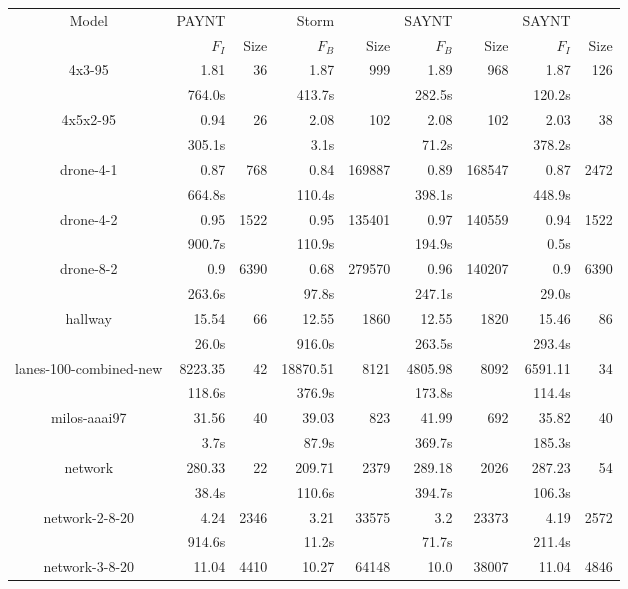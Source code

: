 \documentclass{article}
\begin{document}
\begin{table}
\begin{tabular}{|c|rr|rr|rr|rr|}
\hline

Model & PAYNT & & Storm & & SAYNT & & SAYNT & \\ 

 & $F_{I}$ & Size & $F_{B}$ & Size & $F_{B}$ & Size & $F_{I}$ & Size \\ \hline 

4x3-95 & 1.81 & 36 & 1.87 & 999 & 1.89 & 968 & 1.87 & 126 \\
 & 764.0s & & 413.7s & & 282.5s & & 120.2s & \\
\hline
4x5x2-95 & 0.94 & 26 & 2.08 & 102 & 2.08 & 102 & 2.03 & 38 \\
 & 305.1s & & 3.1s & & 71.2s & & 378.2s & \\
\hline
drone-4-1 & 0.87 & 768 & 0.84 & 169887 & 0.89 & 168547 & 0.87 & 2472 \\
 & 664.8s & & 110.4s & & 398.1s & & 448.9s & \\
\hline
drone-4-2 & 0.95 & 1522 & 0.95 & 135401 & 0.97 & 140559 & 0.94 & 1522 \\
 & 900.7s & & 110.9s & & 194.9s & & 0.5s & \\
\hline
drone-8-2 & 0.9 & 6390 & 0.68 & 279570 & 0.96 & 140207 & 0.9 & 6390 \\
 & 263.6s & & 97.8s & & 247.1s & & 29.0s & \\
\hline
hallway & 15.54 & 66 & 12.55 & 1860 & 12.55 & 1820 & 15.46 & 86 \\
 & 26.0s & & 916.0s & & 263.5s & & 293.4s & \\
\hline
lanes-100-combined-new & 8223.35 & 42 & 18870.51 & 8121 & 4805.98 & 8092 & 6591.11 & 34 \\
 & 118.6s & & 376.9s & & 173.8s & & 114.4s & \\
\hline
milos-aaai97 & 31.56 & 40 & 39.03 & 823 & 41.99 & 692 & 35.82 & 40 \\
 & 3.7s & & 87.9s & & 369.7s & & 185.3s & \\
\hline
network & 280.33 & 22 & 209.71 & 2379 & 289.18 & 2026 & 287.23 & 54 \\
 & 38.4s & & 110.6s & & 394.7s & & 106.3s & \\
\hline
network-2-8-20 & 4.24 & 2346 & 3.21 & 33575 & 3.2 & 23373 & 4.19 & 2572 \\
 & 914.6s & & 11.2s & & 71.7s & & 211.4s & \\
\hline
network-3-8-20 & 11.04 & 4410 & 10.27 & 64148 & 10.0 & 38007 & 11.04 & 4846 \\

\end{tabular}
\end{table}
\end{document}
